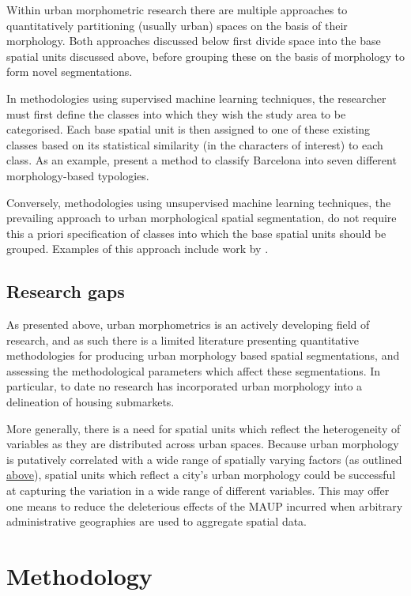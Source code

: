 \documentclass[a4paper, nobind]{templates/ociamthesis}
\begin{document}
Within urban morphometric research there are multiple approaches to quantitatively partitioning (usually urban) spaces on the basis of their morphology. Both approaches discussed below first divide space into the base spatial units discussed above, before grouping these on the basis of morphology to form novel segmentations.

In methodologies using supervised machine learning techniques, the researcher must first define the classes into which they wish the study area to be categorised. Each base spatial unit is then assigned to one of these existing classes based on its statistical similarity (in the characters of interest) to each class. As an example, \citet{colaninno2011} present a method to classify Barcelona into seven different morphology-based typologies.

Conversely, methodologies using unsupervised machine learning techniques, the prevailing approach to urban morphological spatial segmentation, do not require this a priori specification of classes into which the base spatial units should be grouped. Examples of this approach include work by \citet{fleischmann2021}.

\hypertarget{research-gaps}{%
\section{Research gaps}\label{research-gaps}}

As presented above, urban morphometrics is an actively developing field of research, and as such there is a limited literature presenting quantitative methodologies for producing urban morphology based spatial segmentations, and assessing the methodological parameters which affect these segmentations. In particular, to date no research has incorporated urban morphology into a delineation of housing submarkets.

More generally, there is a need for spatial units which reflect the heterogeneity of variables as they are distributed across urban spaces. Because urban morphology is putatively correlated with a wide range of spatially varying factors (as outlined \protect\hyperlink{urban-morphology}{above}), spatial units which reflect a city's urban morphology could be successful at capturing the variation in a wide range of different variables. This may offer one means to reduce the deleterious effects of the MAUP incurred when arbitrary administrative geographies are used to aggregate spatial data.

\hypertarget{methods}{%
\chapter{Methodology}\label{methods}}
\end{document}

